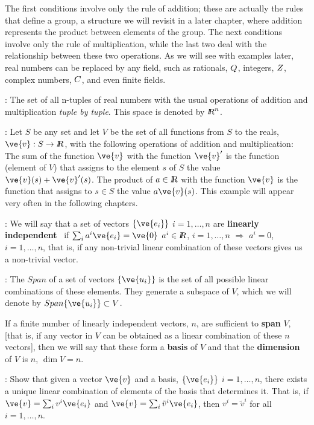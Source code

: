 The first conditions involve only the rule of addition; these are actually the rules that 
define a group, a structure we will revisit in a later chapter, where addition represents the product between elements of the group.
The next conditions involve only the rule of multiplication, while
the last two deal with the relationship between these two operations. As we will see with examples later, real numbers can be replaced by any field, such as rationals, $Q$, integers, $Z$, complex numbers, $C$, and even finite fields.

\espa

\ejem: The set of all n-tuples of real numbers with the
usual operations of addition and multiplication {\it tuple by tuple}.
This space is denoted by $\mbox{\sl {l$\!\!\!\;\:\!$R}}^n$.

\ejem: Let $S$ be any set and let $V$ be the set of all functions
from $S$ to the reals, $\ve{v}:S \to \re$, with the following
operations of addition and multiplication: The sum of the function $\ve{v}$ with
the function $\ve{v}'$ is the function (element of $V$) that assigns to the element
$s$ of $S$ the value $\ve{v}(s) + \ve{v}'(s)$. The product of
$a \in \mbox{\sl {l$\!\!\!\;\:\!$R}}$ with the function $\ve{v}$ is the function that assigns to $s \in S$
the value $a\ve{v}(s)$.
This example will appear very often in the following chapters.

: We will say that a set of vectors $\{\ve{e_i}\}$ $i=1, \ldots ,n$
are {\bf linearly independent}~ 
if $\sum_i a^i \ve{e_i} = \ve{0}$ $a^i \in \mbox{\sl {l$\!\!\!\;\:\!$R}}$, 
$i= 1, \ldots ,n$ $\Longrightarrow $ $a^i = 0$, $i= 1, \ldots ,n$,
that is, if any non-trivial linear combination of these vectors gives us a non-trivial vector. 

: The $Span$ of a set of vectors $\{\ve{u_{i}}\}$ is the set of all possible linear combinations of these elements. They generate a subspace of $V$, which we will denote by $Span\{\ve{u_{i}}\}\subset V$. 

If a finite number of linearly independent vectors, 
$n$, are sufficient to {\bf span} $V$, [that is, if 
any vector in $V$ can be obtained as a linear combination of 
these $n$ vectors], then we will say that these form a {\bf basis} of 
$V$ and that the {\bf dimension}~  of $V$ is $n$, $\dim V = n$.
\espa

\ejer: Show that given a vector $\ve{v}$ and a basis, $\{\ve{e_i}\}$ $i=1, \ldots ,n$, there exists a 
unique linear combination of elements of the basis that determines it. That is, if 
$\ve{v} =  \sum_i v^i \ve{e_i} $ and $\ve{v} = \sum_i \tilde{v}^i \ve{e_i} $, then $v^i=\tilde{v}^i$ for all
$i=1, \ldots ,n$.

